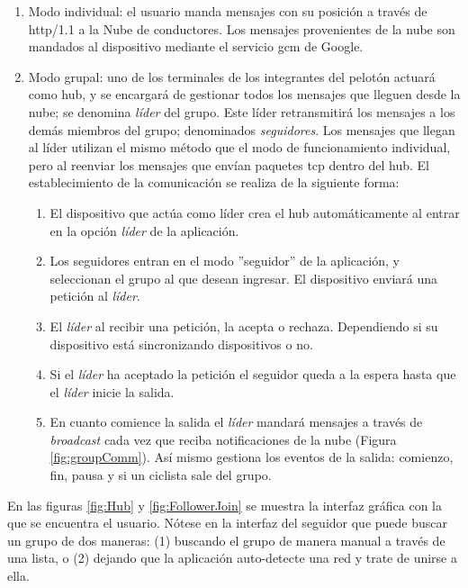 \begin{enumerate}
	\item Modo individual: el usuario manda mensajes con su posición a través
	de \Gls{http/1.1} a la Nube de conductores. Los mensajes provenientes de la
	nube son mandados al dispositivo mediante el servicio \gls{gcm} de Google.

	\item Modo grupal: uno de los terminales de los integrantes del pelotón
	actuará	como hub, y se encargará de	gestionar todos los mensajes que
	lleguen desde la nube; se denomina \emph{líder} del grupo. Este líder
	retransmitirá los mensajes a los demás miembros del grupo; denominados
	\emph{seguidores}. Los mensajes que llegan al líder utilizan el mismo método
	que el modo de funcionamiento individual, pero al reenviar los mensajes que
	envían paquetes \gls{tcp} dentro del hub. El establecimiento de la
	comunicación se realiza de la siguiente forma:

	\begin{enumerate}
		\item El dispositivo que actúa como líder crea el hub automáticamente al
		entrar en la opción \emph{líder} de la aplicación.

		\item Los seguidores entran en el modo ''seguidor'' de la aplicación, y
		seleccionan el grupo al que desean ingresar. El dispositivo enviará una
		petición al \emph{líder}.

		\item El \emph{líder} al recibir una petición, la acepta o rechaza.
		Dependiendo	si su dispositivo está sincronizando dispositivos o no.

		\item Si el \emph{líder} ha aceptado la petición el seguidor queda a la
		espera hasta que el \emph{líder} inicie la salida.

		\item En cuanto comience la salida el \emph{líder} mandará mensajes a
		través de \emph{broadcast} cada vez que reciba notificaciones de la nube
		(Figura \ref{fig:groupComm}). Así mismo	gestiona los eventos de la
		salida: comienzo, fin, pausa y si un ciclista sale del grupo.
	\end{enumerate}
\end{enumerate}

En las figuras \ref{fig:Hub} y \ref{fig:FollowerJoin} se muestra la
interfaz gráfica con la que se encuentra el usuario. Nótese en la interfaz
del seguidor que puede buscar un grupo de dos maneras: (1) buscando el grupo
de manera manual a través de una lista, o (2) dejando que la aplicación
auto-detecte una red y trate de unirse a ella.

